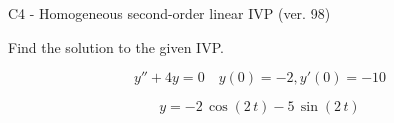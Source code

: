 \begin{exercise}
  \begin{exerciseTitle}C4 - Homogeneous second-order linear IVP (ver. 98)\end{exerciseTitle}
  \begin{exerciseStatement}
    
Find the solution to the given IVP.

    
\[y''+4y = 0 \hspace{1em} y(0) = -2 , y'(0) = -10\]

  \end{exerciseStatement}
  \begin{exerciseAnswer}
    
\[y= -2 \, \cos\left(2 \, t\right) - 5 \, \sin\left(2 \, t\right)\]

  \end{exerciseAnswer}
\end{exercise}